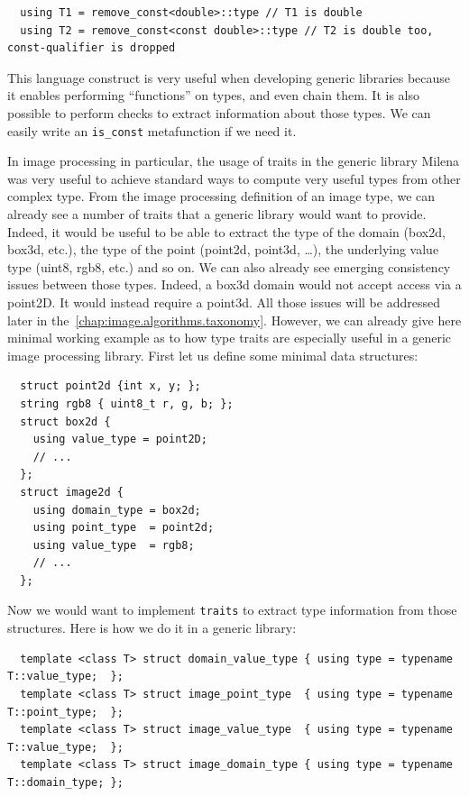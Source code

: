 \begin{verbatim}
  using T1 = remove_const<double>::type // T1 is double
  using T2 = remove_const<const double>::type // T2 is double too, const-qualifier is dropped
\end{verbatim}

This language construct is very useful when developing generic libraries because it enables performing ``functions'' on
types, and even chain them. It is also possible to perform checks to extract information about those types. We can
easily write an \texttt{is\_const} metafunction if we need it.

In image processing in particular, the usage of traits in the generic library Milena was very useful to achieve standard
ways to compute very useful types from other complex type. From the image processing definition of an image type, we can
already see a number of traits that a generic library would want to provide. Indeed, it would be useful to be able to
extract the type of the domain (box2d, box3d, etc.), the type of the point (point2d, point3d, \ldots), the underlying
value type (uint8, rgb8, etc.) and so on. We can also already see emerging consistency issues between those types.
Indeed, a box3d domain would not accept access via a point2D. It would instead require a point3d. All those issues will
be addressed later in the~\cref{chap:image.algorithms.taxonomy}. However, we can already give here minimal working
example as to how type traits are especially useful in a generic image processing library. First let us define some
minimal data structures:

\begin{verbatim}
  struct point2d {int x, y; };
  string rgb8 { uint8_t r, g, b; };
  struct box2d {
    using value_type = point2D;
    // ...
  };
  struct image2d {
    using domain_type = box2d;
    using point_type  = point2d;
    using value_type  = rgb8;
    // ...
  };
\end{verbatim}

Now we would want to implement \texttt{traits} to extract type information from those structures. Here is how we do it
in a generic library:

\begin{verbatim}
  template <class T> struct domain_value_type { using type = typename T::value_type;  };
  template <class T> struct image_point_type  { using type = typename T::point_type;  };
  template <class T> struct image_value_type  { using type = typename T::value_type;  };
  template <class T> struct image_domain_type { using type = typename T::domain_type; };
\end{verbatim}

